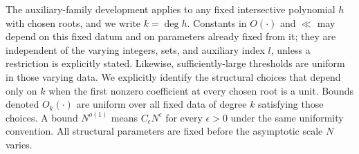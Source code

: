 The auxiliary-family development applies to any fixed intersective polynomial
$h$ with chosen roots, and we write $k=\deg h$. Constants in $O(\cdot)$ and
$\ll$ may depend on this fixed datum and on parameters already fixed from it;
they are independent of the varying integers, sets, and auxiliary index $l$,
unless a restriction is explicitly stated. Likewise, sufficiently-large
thresholds are uniform in those varying data. We explicitly identify the
structural choices that depend only on $k$ when the first nonzero coefficient
at every chosen root is a unit. Bounds denoted $O_k(\cdot)$ are uniform over
all fixed data of degree $k$ satisfying those choices. A bound $N^{o(1)}$
means $C_\epsilon N^\epsilon$ for every $\epsilon>0$ under the same
uniformity convention. All structural parameters are fixed before the
asymptotic scale $N$ varies.
